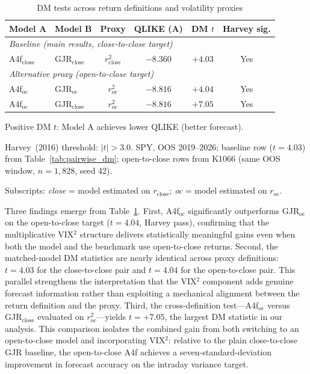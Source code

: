 \begin{table}[H]
\centering
\caption{DM tests across return definitions and volatility proxies}
\label{tab:dual_target_dm}
\begin{threeparttable}
\small
\begin{tabular}{@{}llcccc@{}}
\toprule
Model A & Model B & Proxy & QLIKE (A) & DM $t$ & Harvey sig. \\
\midrule
\multicolumn{6}{l}{\textit{Baseline (main results, close-to-close target)}} \\[2pt]
A4f$_\mathrm{close}$ & GJR$_\mathrm{close}$ & $r^2_\mathrm{close}$ & $-8.360$ & $+4.03$ & Yes \\[4pt]
\multicolumn{6}{l}{\textit{Alternative proxy (open-to-close target)}} \\[2pt]
A4f$_\mathrm{oc}$ & GJR$_\mathrm{oc}$    & $r^2_\mathrm{oc}$ & $-8.816$ & $+4.04$ & Yes \\
A4f$_\mathrm{oc}$ & GJR$_\mathrm{close}$ & $r^2_\mathrm{oc}$ & $-8.816$ & $+7.05$ & Yes \\
\bottomrule
\end{tabular}
\begin{tablenotes}
\footnotesize
\item Positive DM $t$: Model A achieves lower QLIKE (better forecast).
\item Harvey~(2016) threshold: $|t| > 3.0$. SPY, OOS 2019--2026;
      baseline row ($t=4.03$) from Table~\ref{tab:pairwise_dm}; open-to-close rows
      from K1066 (same OOS window, $n=1{,}828$, seed 42).
\item Subscripts: \textit{close} = model estimated on $r_\mathrm{close}$;
      \textit{oc} = model estimated on $r_\mathrm{oc}$.
\end{tablenotes}
\end{threeparttable}
\end{table}

Three findings emerge from Table~\ref{tab:dual_target_dm}.
First, A4f$_\mathrm{oc}$ significantly outperforms GJR$_\mathrm{oc}$ on the open-to-close
target ($t = 4.04$, Harvey pass), confirming that the multiplicative VIX$^2$ structure
delivers statistically meaningful gains even when both the model and the benchmark
use open-to-close returns.
Second, the matched-model DM statistics are nearly identical across proxy definitions:
$t = 4.03$ for the close-to-close pair and $t = 4.04$ for the open-to-close pair.
This parallel strengthens the interpretation that the VIX$^2$ component adds genuine
forecast information rather than exploiting a mechanical alignment between the return
definition and the proxy.
Third, the cross-definition test---A4f$_\mathrm{oc}$ versus GJR$_\mathrm{close}$ evaluated
on $r^2_\mathrm{oc}$---yields $t = +7.05$, the largest DM statistic in our analysis.
This comparison isolates the combined gain from both switching to an open-to-close
model and incorporating VIX$^2$: relative to the plain close-to-close GJR baseline,
the open-to-close A4f achieves a seven-standard-deviation improvement in forecast
accuracy on the intraday variance target.

